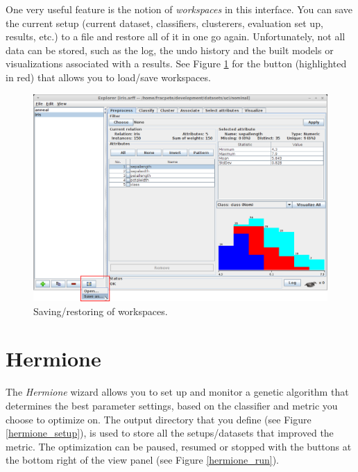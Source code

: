 One very useful feature is the notion of \textit{workspaces} in this interface.
You can save the current setup (current dataset, classifiers, clusterers,
evaluation set up, results, etc.) to a file and restore all of it in one go
again. Unfortunately, not all data can be stored, such as the log, the undo
history and the built models or visualizations associated with a results.
See Figure \ref{explorerext-workspaces} for the button (highlighted in red)
that allows you to load/save workspaces.

\begin{figure}[htb]
  \centering
  \includegraphics[width=12.0cm]{images/explorerext-workspaces.png}
  \caption{Saving/restoring of workspaces.}
  \label{explorerext-workspaces}
\end{figure}

\clearpage
\section{Hermione}
The \textit{Hermione} wizard allows you to set up and monitor a genetic
algorithm that determines the best parameter settings, based on the classifier
and metric you choose to optimize on. The output directory that you define
(see Figure \ref{hermione_setup}), is used to store all the setups/datasets
that improved the metric. The optimization can be paused, resumed or
stopped with the buttons at the bottom right of the view panel (see Figure
\ref{hermione_run}).

